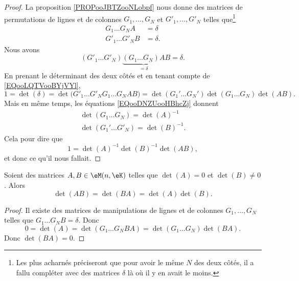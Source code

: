 \begin{proof}
	La proposition \ref{PROPooJBTZooNLobpf} nous donne des matrices de permutations de lignes et de colonnes \( G_1,\ldots, G_N\) et \( G'_1,\ldots, G'_N\) telles que\footnote{Les plus acharnés préciseront que pour avoir le même \( N\) des deux côtés, il a fallu compléter avec des matrices \( \delta\) là où il y en avait le moins.}
	\begin{subequations}        \label{EQooDNZUooHBhcZj}
		\begin{align}
			G_1\ldots G_NA   & =\delta  \\
			G'_1\ldots G'_NB & =\delta.
		\end{align}
	\end{subequations}
	Nous avons
	\begin{equation}
		(G'_1\ldots G'_N)\underbrace{(G_1\ldots G_N)A}_{=\delta}B=\delta.
	\end{equation}
	En prenant le déterminant des deux côtés et en tenant compte de \eqref{EQooLQTVooBYjVYl},
	\begin{equation}
		1=\det(\delta)=\det\big(  G'_1\ldots G'_NG_1\ldots G_NAB\big)=\det(G_1'\ldots G_N')\det(G_1\ldots G_N)\det(AB).
	\end{equation}
	Mais en même temps, les équations \ref{EQooDNZUooHBhcZj} donnent
	\begin{subequations}
		\begin{align}
			\det(G_1\ldots G_N)=\det(A)^{-1} \\
			\det(G_1'\ldots G'_N)=\det(B)^{-1}.
		\end{align}
	\end{subequations}
	Cela pour dire que
	\begin{equation}
		1=\det(A)^{-1}\det(B)^{-1}\det(AB),
	\end{equation}
	et donc ce qu'il nous fallait.
\end{proof}

\begin{proposition}     \label{PROPooWVJFooTmqoec}
	Soient des matrices \( A,B\in \eM(n,\eK)\) telles que \( \det(A)=0\) et \( \det(B)\neq0\). Alors
	\begin{equation}
		\det(AB)=\det(BA)=\det(A)\det(B).
	\end{equation}
\end{proposition}

\begin{proof}
	Il existe des matrices de manipulations de lignes et de colonnes \( G_1,\ldots, G_N\) telles que \( G_1\ldots G_NB=\delta\). Donc
	\begin{equation}
		0=\det(A)=\det(G_1\ldots G_NBA)=\det(G_1\ldots G_N)\det(BA).
	\end{equation}
	Donc \( \det(BA)=0\).
\end{proof}

